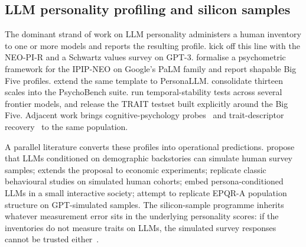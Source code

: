 \documentclass[11pt]{article}
\begin{document}
\subsection{LLM personality profiling and silicon samples}
\label{sec:related-profiling}

The dominant strand of work on LLM personality administers a human inventory to one or more models and reports the resulting profile. \citet{miotto2023gpt3} kick off this line with the NEO-PI-R and a Schwartz values survey on GPT-3. \citet{serapio2025psychometric} formalise a psychometric framework for the IPIP-NEO on Google's PaLM family and report shapable Big Five profiles. \citet{jiang2023personallm} extend the same template to PersonaLLM. \citet{huang2023psychobench} consolidate thirteen scales into the PsychoBench suite. \citet{bodroza2024personality} run temporal-stability tests across several frontier models, and \citet{lee2025trait} release the TRAIT testset built explicitly around the Big Five. Adjacent work brings cognitive-psychology probes~\citep{binz2023psychology} and trait-descriptor recovery~\citep{suh2024rediscovering} to the same population.

A parallel literature converts these profiles into operational predictions. \citet{argyle2023one} propose that LLMs conditioned on demographic backstories can simulate human survey samples; \citet{horton2023homo} extends the proposal to economic experiments; \citet{aher2023using} replicate classic behavioural studies on simulated human cohorts; \citet{park2023generative} embed persona-conditioned LLMs in a small interactive society; \citet{ferreira2025matching} attempt to replicate EPQR-A population structure on GPT-simulated samples. The silicon-sample programme inherits whatever measurement error sits in the underlying personality scores: if the inventories do not measure traits on LLMs, the simulated survey responses cannot be trusted either~\citep{tjuatja2023response,salecha2024llm,larooij2025validation}.
\end{document}
